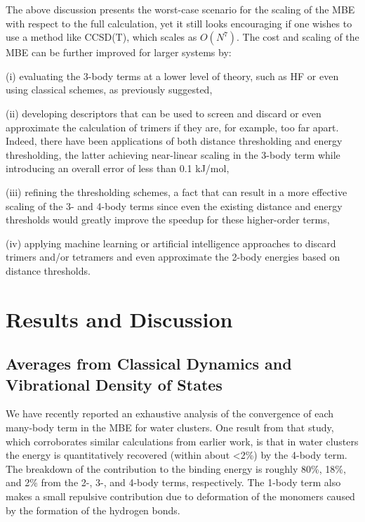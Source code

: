 \documentclass[11pt, proquest]{uwthesis}[2020/02/24]
\begin{document}
\par The above discussion presents the worst-case scenario for the scaling of the MBE with respect to the full calculation, yet it still looks encouraging if one wishes to use a method like CCSD(T), which scales as $O(N^7)$. The cost and scaling of the MBE can be further improved for larger systems by:
\par (i) evaluating the 3-body terms at a lower level of theory, such as HF or even using classical schemes, as previously suggested\autocite{heindel_many-body_2020},
\par (ii) developing descriptors that can be used to screen and discard or even approximate the calculation of trimers if they are, for example, too far apart. Indeed, there have been applications of both distance thresholding\autocite{cui_theoretical_2006} and energy thresholding,\cite{liu_energy-screened_2019} the latter achieving near-linear scaling in the 3-body term while introducing an overall error of less than 0.1 kJ/mol,
\par (iii) refining the thresholding schemes, a fact that can result in a more effective scaling of the 3- and 4-body terms since even the existing distance and energy thresholds would greatly improve the speedup for these higher-order terms,
\par (iv) applying machine learning or artificial intelligence approaches to discard trimers and/or tetramers and even approximate the 2-body energies based on distance thresholds.

\section{Results and Discussion}
\subsection{Averages from Classical Dynamics and Vibrational Density of States}
\par We have recently reported an exhaustive analysis of the convergence of each many-body term in the MBE for water clusters.\autocite{heindel_many-body_2020} One result from that study, which corroborates similar calculations from earlier work,\autocite{lao_understanding_2016} is that in water clusters the energy is quantitatively recovered (within about \textless2\%) by the 4-body term. The breakdown of the contribution to the binding energy is roughly 80\%, 18\%, and 2\% from the 2-, 3-, and 4-body terms, respectively. The 1-body term also makes a small repulsive contribution due to deformation of the monomers caused by the formation of the hydrogen bonds.
\end{document}
